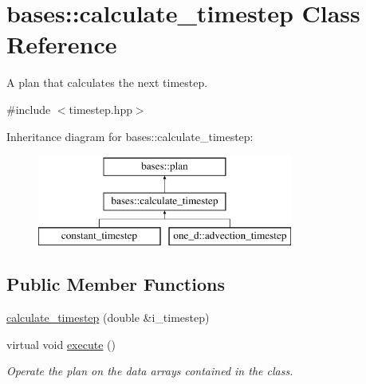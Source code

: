 \hypertarget{classbases_1_1calculate__timestep}{\section{bases\-:\-:calculate\-\_\-timestep Class Reference}
\label{classbases_1_1calculate__timestep}
}


A plan that calculates the next timestep.  




{\ttfamily \#include $<$timestep.\-hpp$>$}

Inheritance diagram for bases\-:\-:calculate\-\_\-timestep\-:\begin{figure}[H]
\begin{center}
\leavevmode
\includegraphics[height=3.000000cm]{classbases_1_1calculate__timestep}
\end{center}
\end{figure}
\subsection*{Public Member Functions}
\begin{DoxyCompactItemize}
\item 
\hyperlink{classbases_1_1calculate__timestep_a385ca9d7bcda910da6829038222fc652}{calculate\-\_\-timestep} (double \&i\-\_\-timestep)
\item 
virtual void \hyperlink{classbases_1_1calculate__timestep_a5a88213985ce200a1fb2a09365a6e531}{execute} ()
\begin{DoxyCompactList}\small\item\em Operate the plan on the data arrays contained in the class. \end{DoxyCompactList}\end{DoxyCompactItemize}
